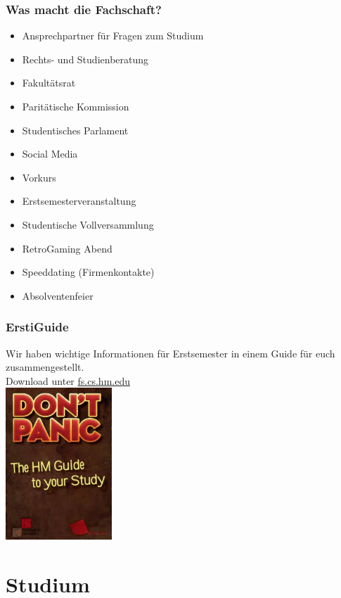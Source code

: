 \documentclass{beamer}
\begin{document}
	\begin{frame}[t]
		\frametitle{Was macht die Fachschaft?}
		
		\begin{itemize}
			\item Ansprechpartner für Fragen zum Studium
			\item Rechts- und Studienberatung
			\item Fakultätsrat
			\item Paritätische Kommission
			\item Studentisches Parlament
			\item Social Media
		\end{itemize}
		\bigskip
		\begin{itemize}
			\item Vorkurs
			\item Erstsemesterveranstaltung
			\item Studentische Vollversammlung
			\item RetroGaming Abend
			\item Speeddating (Firmenkontakte)
			\item Absolventenfeier
		\end{itemize}
	\end{frame}
	
	\begin{frame}[t]
		\frametitle{ErstiGuide}
		Wir haben wichtige Informationen für Erstsemester in einem Guide für euch zusammengestellt.\\
		\bigskip
		Download unter \url{fs.cs.hm.edu}\\
		\center
		\includegraphics[width=0.3\textwidth]{erstiguide.jpg}
	\end{frame}
	
	\section{Studium}
	
\end{document}
